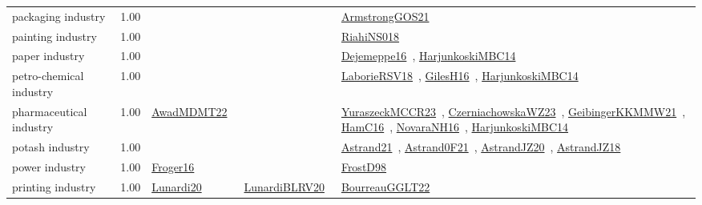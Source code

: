 {\begin{longtable}{p{3cm}r>{\raggedright\arraybackslash}p{6cm}>{\raggedright\arraybackslash}p{6cm}>{\raggedright\arraybackslash}p{8cm}}
\index{packaging industry}\index{Industries!packaging industry}packaging industry &  1.00 &  &  & \href{../works/ArmstrongGOS21.pdf}{ArmstrongGOS21}~\cite{ArmstrongGOS21}\\
\index{painting industry}\index{Industries!painting industry}painting industry &  1.00 &  &  & \href{../works/RiahiNS018.pdf}{RiahiNS018}~\cite{RiahiNS018}\\
\index{paper industry}\index{Industries!paper industry}paper industry &  1.00 &  &  & \href{../works/Dejemeppe16.pdf}{Dejemeppe16}~\cite{Dejemeppe16}, \href{../works/HarjunkoskiMBC14.pdf}{HarjunkoskiMBC14}~\cite{HarjunkoskiMBC14}\\
\index{petro-chemical industry}\index{Industries!petro-chemical industry}petro-chemical industry &  1.00 &  &  & \href{../works/LaborieRSV18.pdf}{LaborieRSV18}~\cite{LaborieRSV18}, \href{../works/GilesH16.pdf}{GilesH16}~\cite{GilesH16}, \href{../works/HarjunkoskiMBC14.pdf}{HarjunkoskiMBC14}~\cite{HarjunkoskiMBC14}\\
\index{pharmaceutical industry}\index{Industries!pharmaceutical industry}pharmaceutical industry &  1.00 & \href{../works/AwadMDMT22.pdf}{AwadMDMT22}~\cite{AwadMDMT22} &  & \href{../works/YuraszeckMCCR23.pdf}{YuraszeckMCCR23}~\cite{YuraszeckMCCR23}, \href{../works/CzerniachowskaWZ23.pdf}{CzerniachowskaWZ23}~\cite{CzerniachowskaWZ23}, \href{../works/GeibingerKKMMW21.pdf}{GeibingerKKMMW21}~\cite{GeibingerKKMMW21}, \href{../works/HamC16.pdf}{HamC16}~\cite{HamC16}, \href{../works/NovaraNH16.pdf}{NovaraNH16}~\cite{NovaraNH16}, \href{../works/HarjunkoskiMBC14.pdf}{HarjunkoskiMBC14}~\cite{HarjunkoskiMBC14}\\
\index{potash industry}\index{Industries!potash industry}potash industry &  1.00 &  &  & \href{../works/Astrand21.pdf}{Astrand21}~\cite{Astrand21}, \href{../works/Astrand0F21.pdf}{Astrand0F21}~\cite{Astrand0F21}, \href{../works/AstrandJZ20.pdf}{AstrandJZ20}~\cite{AstrandJZ20}, \href{../works/AstrandJZ18.pdf}{AstrandJZ18}~\cite{AstrandJZ18}\\
\index{power industry}\index{Industries!power industry}power industry &  1.00 & \href{../works/Froger16.pdf}{Froger16}~\cite{Froger16} &  & \href{../works/FrostD98.pdf}{FrostD98}~\cite{FrostD98}\\
\index{printing industry}\index{Industries!printing industry}printing industry &  1.00 & \href{../works/Lunardi20.pdf}{Lunardi20}~\cite{Lunardi20} & \href{../works/LunardiBLRV20.pdf}{LunardiBLRV20}~\cite{LunardiBLRV20} & \href{../works/BourreauGGLT22.pdf}{BourreauGGLT22}~\cite{BourreauGGLT22}\\

\end{longtable}}
